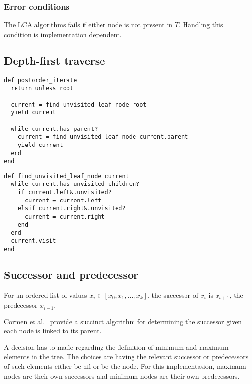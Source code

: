 \documentclass{article}
\begin{document}
\subsubsection{Error conditions}

The LCA algorithms fails if either node is not present in $T$. Handling this
condition is implementation dependent.


\subsection{Depth-first traverse}

\begin{lstlisting}[frame=single,title=Traverse the tree from the bottom up.]
def postorder_iterate
  return unless root

  current = find_unvisited_leaf_node root
  yield current

  while current.has_parent?
    current = find_unvisited_leaf_node current.parent
    yield current
  end
end
\end{lstlisting}

\begin{lstlisting}[frame=single,title=Find the deepest leftmost unvisited node relative to current.]
def find_unvisited_leaf_node current
  while current.has_unvisited_children?
    if current.left&.unvisited?
      current = current.left
    elsif current.right&.unvisited?
      current = current.right
    end
  end
  current.visit
end
\end{lstlisting}

\subsection{Successor and predecessor}

\setcounter{sno}{0}

\sno For an ordered list of values $x_i \in [x_0, x_1,\ldots,x_k]$, the successor of
$x_i$ is $x_{i+1}$, the predecessor $x_{i-1}$.

\sno Cormen et al.~\cite[p. 248-249]{cormen:th:1990} provide a succinct algorithm for
determining the successor given each node is linked to its parent.

\sno A decision has to made regarding the definition of minimum and maximum
elements in the tree. \sno The choices are having the relevant successor or
predecessors of such elements either be nil or be the node. \sno For this implementation,
maximum nodes are their own successors and minimum nodes are their
own predecessors.
\end{document}

